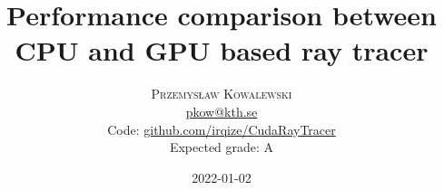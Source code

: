 \documentclass[article,
12pt, 
a4paper,  
english]{article}
\title{Performance comparison between CPU and GPU based ray tracer} %
\author{%
\textsc{Przemysław Kowalewski}
\normalsize \\ \href{mailto:pkow@kth.se}{pkow@kth.se} \\
\normalsize Code: \href{https://github.com/irqize/CudaRayTracer}{github.com/irqize/CudaRayTracer} \\
\normalsize Expected grade: A
}
\date{2022-01-02}
\begin{document}
\begin{titlingpage}
\maketitle
\end{titlingpage}
\onehalfspacing

\singlespacing
\vspace{1cm}
\printbibliography
\end{document}
